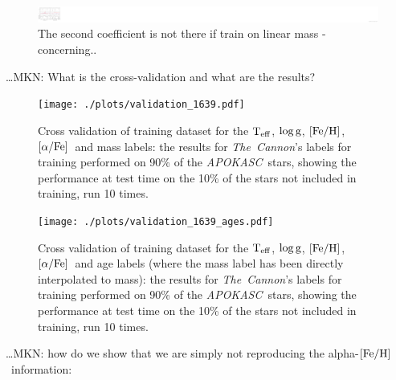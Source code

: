 \documentclass[12pt, preprint]{aastex}
\newcommand{\project}[1]{\textsl{#1}}
\newcommand{\tc}{\project{The~Cannon}}
\newcommand{\apokasc}{\project{APOKASC}}
\newcommand{\teff}{\mbox{$\rm T_{eff}$}}
\newcommand{\feh}{\mbox{$\rm [Fe/H]$}}
\newcommand{\alphafe}{\mbox{$\rm [\alpha/Fe]$}}
\newcommand{\logg}{\mbox{$\rm \log g$}}
\begin{document}
\begin{figure}[p!]
\centering
    \includegraphics[scale=0.51]{./plots/coeffs_m_3.png}
  \caption{The second coefficient is not there if train on linear mass - concerning..}
\label{fig:g}
\end{figure}



\ldots MKN: What is the cross-validation and what are the results?
\begin{figure}[p!]
\centering
        \texttt{[image: ./plots/validation\_1639.pdf]}
  \caption{Cross validation of training dataset for the \teff, \logg, \feh, \alphafe\ and mass labels: the results for \tc's labels for training performed on 90\% of the \apokasc\ stars, showing the performance at test time on the 10\% of the stars not included in training, run 10 times.}
\label{fig:validation}
\end{figure}

\begin{figure}[p!]
\centering
        \texttt{[image: ./plots/validation\_1639\_ages.pdf]}
  \caption{Cross validation of training dataset for the \teff, \logg, \feh, \alphafe\ and age labels (where the mass label has been directly interpolated to mass): the results for \tc's labels for training performed on 90\% of the \apokasc\ stars, showing the performance at test time on the 10\% of the stars not included in training, run 10 times.}
\label{fig:validation}
\end{figure}


\ldots MKN: how do we show that we are simply not reproducing the alpha-\feh\ information:
\end{document}
